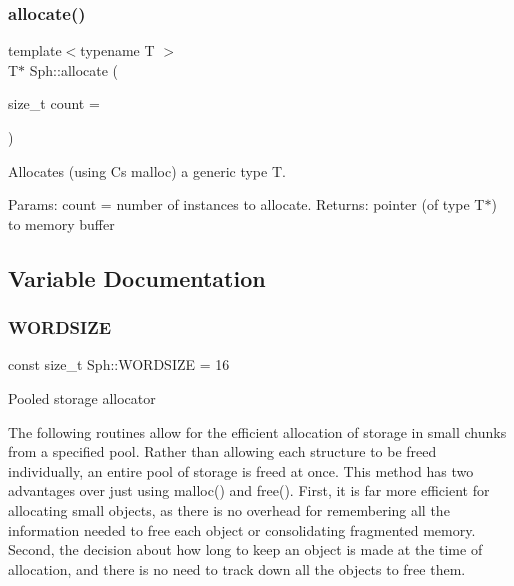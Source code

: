 \subsubsection{\texorpdfstring{allocate()}{allocate()}}
{\footnotesize\ttfamily template$<$typename T $>$ \\
T$\ast$ Sph\+::allocate (\begin{DoxyParamCaption}\item[{size\+\_\+t}]{count = {} }\end{DoxyParamCaption})\hspace{0.3cm}{\ttfamily [inline]}}

Allocates (using C\textquotesingle{}s malloc) a generic type T.

Params\+: count = number of instances to allocate. Returns\+: pointer (of type T$\ast$) to memory buffer 

\subsection{Variable Documentation}
\hypertarget{group__memalloc__grp_ga72b23d35004c0a869d61d4848bdc3bc8}{}\label{group__memalloc__grp_ga72b23d35004c0a869d61d4848bdc3bc8} 
\subsubsection{\texorpdfstring{W\+O\+R\+D\+S\+I\+ZE}{WORDSIZE}}
{\footnotesize\ttfamily const size\+\_\+t Sph\+::\+W\+O\+R\+D\+S\+I\+ZE = 16}

Pooled storage allocator

The following routines allow for the efficient allocation of storage in small chunks from a specified pool. Rather than allowing each structure to be freed individually, an entire pool of storage is freed at once. This method has two advantages over just using malloc() and free(). First, it is far more efficient for allocating small objects, as there is no overhead for remembering all the information needed to free each object or consolidating fragmented memory. Second, the decision about how long to keep an object is made at the time of allocation, and there is no need to track down all the objects to free them. 